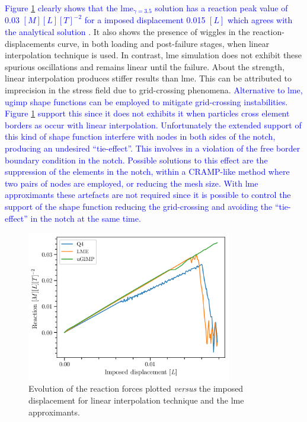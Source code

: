 \documentclass[preprint,12pt,a4paper]{elsarticle}
\newcommand{\MMP}[1]{
  \textcolor{blue}{{#1}}
}
\begin{document}
\MMP{Figure \ref{fig:Reactions-cracked-panel-mode-I} clearly shows that the
\acrshort{lme}$_{\gamma = 3.5}$ solution has a reaction peak value of 0.03 $[M] [L]
[T]^{-2}$ for a imposed displacement 0.015 $[L]$ which agrees with the
analytical solution \cite{Pandolfi_2012}}. It also shows the presence
of wiggles in the reaction-displacements curve, in both loading and
post-failure stages, when linear interpolation technique is used. In
contrast, \acrshort{lme} simulation does not exhibit these spurious
oscillations and remains linear until the failure. About the strength,
linear interpolation produces stiffer results than \acrshort{lme}. This can be attributed to imprecision in the
stress field due to grid-crossing phenomena. \MMP{Alternative to
  \acrshort{lme}, \acrshort{ugimp} shape
functions can be employed to mitigate grid-crossing instabilities.
Figure \ref{fig:Reactions-cracked-panel-mode-I} support this since it
does not exhibits it when particles cross element borders as occur
with linear interpolation. Unfortunately the extended support of this
kind of shape function interfere with nodes in both sides of the notch,
producing an undesired ``tie-effect''. This involves in a violation of
the free border boundary condition in the notch. Possible solutions to this effect
are the suppression of the elements in the notch, within a CRAMP-like
method where two pairs of nodes are employed, or reducing the mesh size. With \acrshort{lme}
approximants these artefacts are not required since it is possible to control the support
of the shape function reducing the grid-crossing and avoiding the
``tie-effect'' in the notch at the same time.}\\
\begin{figure}
  \centering
  \includegraphics[width=0.8\textwidth]{Figure-Reactions-Mode-I}
  \caption{Evolution of the reaction forces plotted \textit{versus}
    the imposed displacement for linear interpolation technique and
    the \acrshort{lme} approximants.}
  \label{fig:Reactions-cracked-panel-mode-I}
\end{figure}
\end{document}
